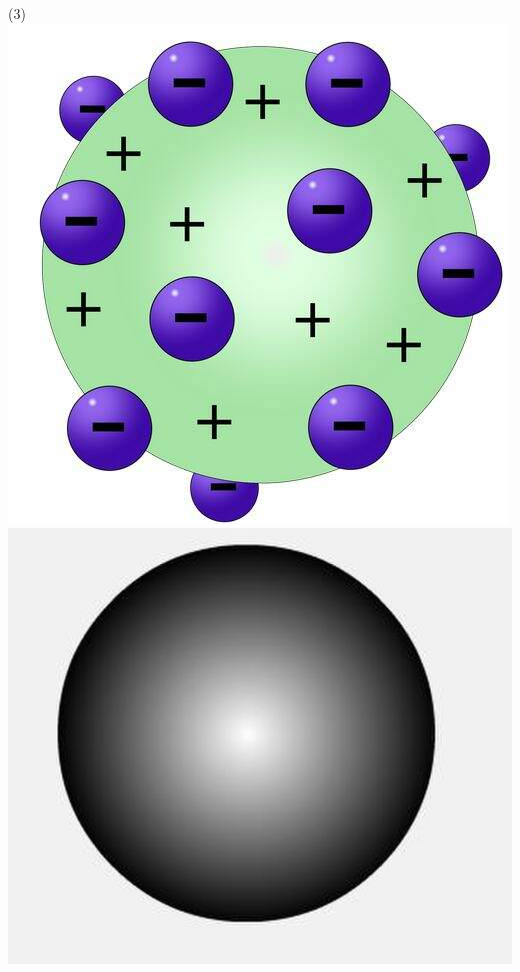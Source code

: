 \documentclass[12pt]{scrartcl}
\begin{document}
\begin{exercise}
\begin{choice}(3)
\choice \includegraphics[scale=.6]{Adaptadas/thomson.jpg}
\choice \includegraphics[scale=.1]{Adaptadas/bilhar.png}

\end{choice}
\end{exercise}
\end{document}
